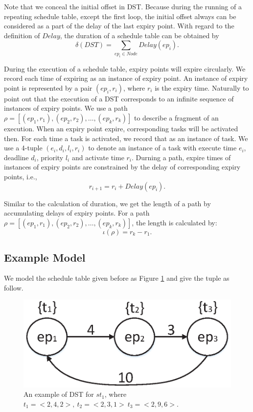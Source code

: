 \documentclass[conference]{IEEEtran}
\begin{document}
Note that we conceal the initial offset in DST. Because during the running of a repeating schedule table, except the first loop, the initial offset always can be considered as a part of the delay of the last expiry point. With regard to the definition of $Delay$, the duration of a schedule table can be obtained by 
\[\delta(DST)=\sum\limits_{ep_i\in Node}Delay(ep_i).\]

During the execution of a schedule table, expiry points will expire circularly. We record each time of expiring as an instance of expiry point. An instance of expiry point is represented by a pair $(ep_i,r_i)$, where $r_i$ is the expiry time. 
Naturally to point out that the execution of a DST corresponds to an infinite sequence of instances of expiry points. 
We use a path $\rho=[(ep_1,r_1),(ep_2,r_2),\dots,(ep_k,r_k)]$ to describe a fragment of an execution. When an expiry point expire, corresponding tasks will be activated then. For each time a task is activated, we record that as an instance of task. We use a 4-tuple $(e_i,d_i,l_i,r_i)$ to denote an instance of a task with execute time $e_i$, deadline $d_i$, priority $l_i$ and activate time $r_i$. Durning a path, expire times of instances of expiry points are constrained by the delay of corresponding expiry points, i.e., 
\[r_{i+1}=r_i+Delay(ep_i).\]

Similar to the calculation of duration, we get the length of a path by accumulating delays of expiry points. For a path $\rho=[(ep_1,r_1),(ep_2,r_2),\dots,(ep_k,r_k)]$, the length is calculated by: \[\iota(\rho)=r_k-r_1.\]


\subsection{Example Model}\label{section_dst_1}
We model the schedule table given before as Figure \ref{figure_dst1} and give the tuple as follow.
\begin{figure}
  \centering
  \includegraphics[scale=.4]{graphics/figure_dst1.eps}
  \caption{An example of DST for $st_1$, where $t_1=<2,4,2>,\ t_2=<2,3,1>\ t_3=<2,9,6>$.}
  \label{figure_dst1}
\end{figure}
\end{document}
